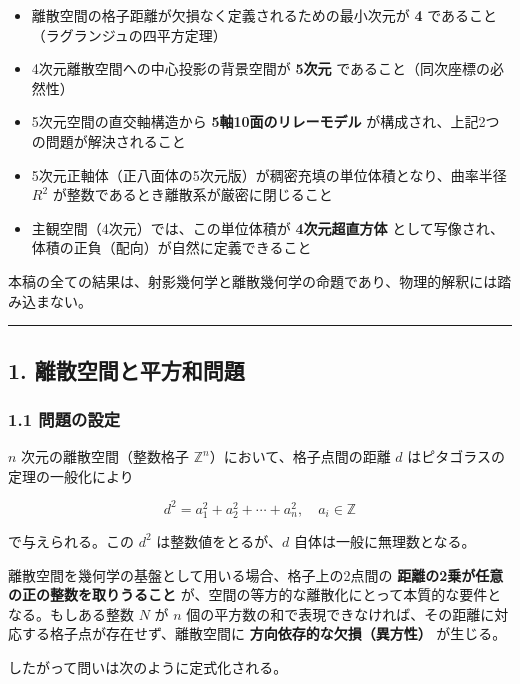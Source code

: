 \documentclass[a4paper,11pt]{ltjsarticle}
\providecommand{\tightlist}{\setlength{\itemsep}{0pt}\setlength{\parskip}{0pt}}
\begin{document}
\begin{itemize}
\tightlist
\item
  離散空間の格子距離が欠損なく定義されるための最小次元が \textbf{4}
  であること（ラグランジュの四平方定理）
\item
  4次元離散空間への中心投影の背景空間が \textbf{5次元}
  であること（同次座標の必然性）
\item
  5次元空間の直交軸構造から \textbf{5軸10面のリレーモデル}
  が構成され、上記2つの問題が解決されること
\item
  5次元正軸体（正八面体の5次元版）が稠密充填の単位体積となり、曲率半径
  \(R^2\) が整数であるとき離散系が厳密に閉じること
\item
  主観空間（4次元）では、この単位体積が \textbf{4次元超直方体}
  として写像され、体積の正負（配向）が自然に定義できること
\end{itemize}

本稿の全ての結果は、射影幾何学と離散幾何学の命題であり、物理的解釈には踏み込まない。

\begin{center}\rule{0.5\linewidth}{0.5pt}\end{center}

\subsection{1.
離散空間と平方和問題}\label{ux96e2ux6563ux7a7aux9593ux3068ux5e73ux65b9ux548cux554fux984c}

\subsubsection{1.1 問題の設定}\label{ux554fux984cux306eux8a2dux5b9a}

\(n\) 次元の離散空間（整数格子
\(\mathbb{Z}^n\)）において、格子点間の距離 \(d\)
はピタゴラスの定理の一般化により

\[d^2 = a_1^2 + a_2^2 + \cdots + a_n^2, \quad a_i \in \mathbb{Z}\]

で与えられる。この \(d^2\) は整数値をとるが、\(d\)
自体は一般に無理数となる。

離散空間を幾何学の基盤として用いる場合、格子上の2点間の
\textbf{距離の2乗が任意の正の整数を取りうること}
が、空間の等方的な離散化にとって本質的な要件となる。もしある整数 \(N\)
が \(n\)
個の平方数の和で表現できなければ、その距離に対応する格子点が存在せず、離散空間に
\textbf{方向依存的な欠損（異方性）} が生じる。

したがって問いは次のように定式化される。
\end{document}
